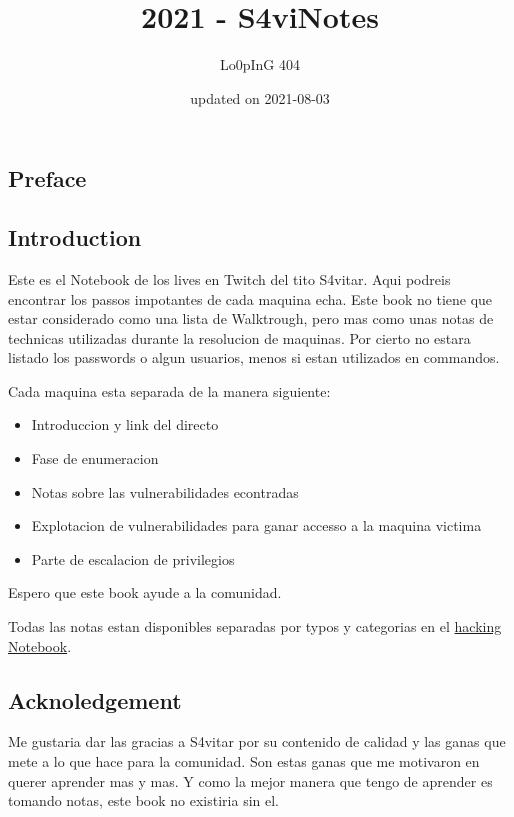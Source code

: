 \documentclass{assets/ipesethesis}
\title{2021 - S4viNotes}
\author{Lo0pInG 404}
\date{updated on 2021-08-03}
\providecommand{\tightlist}{%
  \setlength{\itemsep}{0pt}\setlength{\parskip}{0pt}}
\begin{document}
  \maketitle

\frontmatter %


  \begin{resume}
    \hypertarget{preface}{%
    \section*{Preface}\label{preface}}
    
    \hypertarget{introduction}{%
    \subsection*{Introduction}\label{introduction}}
    
    Este es el Notebook de los lives en Twitch del tito S4vitar. Aqui podreis encontrar los passos impotantes de cada maquina
    echa. Este book no tiene que estar considerado como una lista de Walktrough, pero mas como unas notas de technicas utilizadas
    durante la resolucion de maquinas. Por cierto no estara listado los passwords o algun usuarios, menos si estan utilizados en
    commandos.
    
    Cada maquina esta separada de la manera siguiente:
    
    \begin{itemize}
    \tightlist
    \item
      Introduccion y link del directo
    \item
      Fase de enumeracion
    \item
      Notas sobre las vulnerabilidades econtradas
    \item
      Explotacion de vulnerabilidades para ganar accesso a la maquina victima
    \item
      Parte de escalacion de privilegios
    \end{itemize}
    
    Espero que este book ayude a la comunidad.
    
    Todas las notas estan disponibles separadas por typos y categorias en el \href{https://looping404.michellopez.org}{hacking Notebook}.
    
    \hypertarget{acknoledgement}{%
    \subsection*{Acknoledgement}\label{acknoledgement}}
    
    Me gustaria dar las gracias a S4vitar por su contenido de calidad y las ganas que mete a lo que hace para la comunidad.
    Son estas ganas que me motivaron en querer aprender mas y mas. Y como la mejor manera que tengo de aprender es tomando notas,
    este book no existiria sin el.
  \end{resume}
\end{document}
